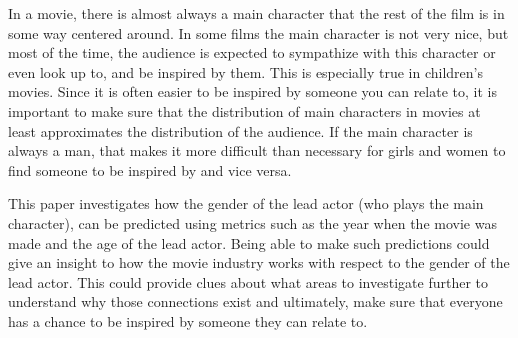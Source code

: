 \documentclass[../../project.tex]{subfiles}
\begin{document}
	In a movie, there is almost always a main character that the rest of the film is in some way centered around. In some films the main character is not very nice, but most of the time, the audience is expected to sympathize with this character or even look up to, and be inspired by them. This is especially true in children's movies. Since it is often easier to be inspired by someone you can relate to, it is important to make sure that the distribution of main characters in movies at least approximates the distribution of the audience. If the main character is always a man, that makes it more difficult than necessary for girls and women to find someone to be inspired by and vice versa.
	
	This paper investigates how the gender of the lead actor (who plays the main character), can be predicted using metrics such as the year when the movie was made and the age of the lead actor. Being able to make such predictions could give an insight to how the movie industry works with respect to the gender of the lead actor. This could provide clues about what areas to investigate further to understand why those connections exist and ultimately, make sure that everyone has a chance to be inspired by someone they can relate to.
\end{document}
